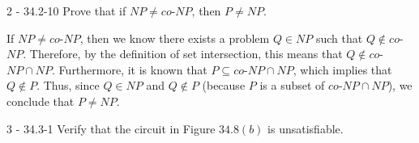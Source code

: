 \documentclass[11pt]{article}
\begin{document}
\begin{prob}{2 - 34.2-10}
Prove that if $NP \not= co$-$NP$, then $P \not= NP$.
\end{prob}
\begin{sol}
If $NP \not= co$-$NP$, then we know there exists a problem $Q \in NP$ such that $Q \notin co$-$NP$. Therefore, by the definition of set intersection, this means that $Q \notin co$-$NP \cap NP$. Furthermore, it is known that $P \subseteq co$-$NP \cap NP$, which implies that $Q \notin P$. Thus, since $Q \in NP$ and $Q \notin P$ (because $P$ is a subset of $co$-$NP \cap NP$), we conclude that $P \not= NP$. 

\end{sol}

\begin{prob}{3 - 34.3-1}
Verify that the circuit in Figure $34.8(b)$ is unsatisfiable.
\end{prob}
\end{document}

